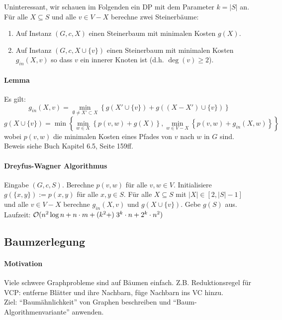 Uninteressant, wir schauen im Folgenden ein DP mit dem Parameter $k = |S|$ an.
Für alle $X \subseteq S$ und alle $v \in V-X$ berechne zwei Steinerbäume:
\begin{enumerate}
    \item Auf Instanz $(G, c, X)$ einen Steinerbaum mit minimalen Kosten $g(X)$.
    \item Auf Instanz $(G, c, X \cup \{v\})$ einen Steinerbaum mit minimalen Kosten $g_{in}(X, v)$ so dass $v$ ein innerer Knoten ist (d.h. $\deg(v) \geq 2$).
\end{enumerate}

\paragraph{Lemma}
Es gilt:
\begin{equation}
g_{in}(X, v) = \min_{\emptyset \neq X' \subset X} \left\{
    g(X' \cup \{v\}) + g \left( (X-X') \cup \{v\} \right)
\right\}
\end{equation}
\begin{equation}
g(X \cup \{v\}) = \min \left\{
    \min_{w \in X} \left\{ p(v,w) + g(X) \right\},
    \min_{w \in V-X} \left\{ p(v,w) + g_{in}(X,w) \right\}
\right\}
\end{equation}
wobei $p(v,w)$ die minimalen Kosten eines Pfades von $v$ nach $w$ in $G$ sind.
Beweis siehe Buch Kapitel 6.5, Seite 159ff.

\paragraph{Dreyfus-Wagner Algorithmus}
Eingabe $(G, c, S)$.
Berechne $p(v, w)$ für alle $v,w \in V$.
Initialisiere $g(\{x,y\}) := p(x,y)$ für alle $x,y \in S$.
Für alle $X \subseteq S$ mit $|X| \in [2, |S|-1]$ und alle $v \in V-X$ berechne $g_{in}(X, v)$ und $g(X \cup \{v\})$.
Gebe $g(S)$ aus.
\\
Laufzeit: $\mathcal{O} (n^2 \log n + n \cdot m + (k^2 + )\; 3^k \cdot n + 2^k \cdot n^2)$


\subsection{Baumzerlegung}

\paragraph{Motivation}
Viele schwere Graphprobleme sind auf Bäumen einfach.
Z.B. Reduktionsregel für VCP: entferne Blätter und ihre Nachbarn, füge Nachbarn ins VC hinzu.
\\
Ziel: ``Baumähnlichkeit'' von Graphen beschreiben und ``Baum-Algorithmenvariante'' anwenden.

